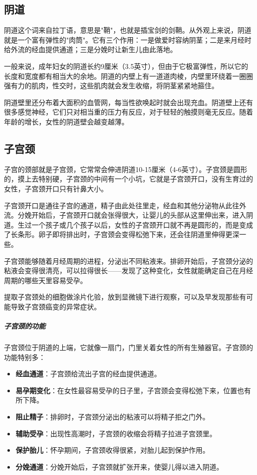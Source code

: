 \begin{enumerate}
\subsection{阴道}

阴道这个词来自拉丁语，意思是"鞘"，也就是插宝剑的剑鞘。从外观上来说，阴道就是一个富有弹性的"肉筒"。它有三个作用：一是做爱时容纳阴茎；二是来月经时给外流的经血提供通道；三是分娩时让新生儿由此落地。

一般来说，成年妇女的阴道长约9厘米（3.5英寸），但由于它极富弹性，所以它的长度和宽度都有相当大的余地。阴道的内壁上有一道道肉棱，内壁里环绕着一圈圈强有力的肌肉，性交时，这些肌肉就会发生收缩，将阴茎紧紧地箍住。

阴道壁里还分布着大面积的血管网，每当性欲唤起时就会出现充血。阴道壁上还有很多感觉神经，它们只对相当重的压力有反应，对于轻轻的触摸则毫无反应。随着年龄的增长，女性的阴道壁会越变越薄。

\subsection{子宫颈}

子宫的颈部就是子宫颈，它常常会伸进阴道10-15厘米（4-6英寸）。子宫颈是圆形的，摸上去特别硬，子宫颈的中间有一个小坑，它就是子宫颈开口，没有生育过的女性，子宫颈开口只有针鼻大小。

子宫颈开口是通往子宫的通道，精子由此处往里走，经血和其他分泌物从此往外流。分娩开始后，子宫颈开口就会张得很大，让婴儿的头部从这里伸出来，进入阴道。生过一个孩子或几个孩子以后，女性的子宫颈开口就不再是圆形的，而是变成了长条形。卵子即将排出时，子宫颈会变得松弛下来，还会往阴道里伸得更深一些。

子宫颈能够随着月经周期的进程，分泌出不同粘液来。排卵开始后，子宫颈分泌的粘液会变得很清亮，可以拉得很长——发现了这种变化，女性就能确定自己在月经周期的哪些天里容易受孕。

提取子宫颈处的细胞做涂片化验，放到显微镜下进行观察，可以及早发现那些有可能导致子宫颈癌变的异常症状。

\subparagraph{子宫颈的功能}

子宫颈位于阴道的上端，它就像一扇门，门里关着女性的所有生殖器官。子宫颈的功能特别多：
\begin{itemize}
    \item \textbf{经血通道}：子宫颈给流出子宫的经血提供通道。
    \item \textbf{易孕期变化}：在女性最容易受孕的日子里，子宫颈会变得松弛下来，位置也有所下降。
    \item \textbf{阻止精子}：排卵时，子宫颈分泌出的粘液可以将精子拒之门外。
    \item \textbf{辅助受孕}：出现性高潮时，子宫颈的收缩会将精子拉进子宫颈里。
    \item \textbf{保护胎儿}：怀孕期间，子宫颈收得很紧，对胎儿起到保护作用。
    \item \textbf{分娩通道}：分娩开始后，子宫颈就扩张开来，使婴儿得以进入阴道。
\end{itemize}


\end{enumerate}
